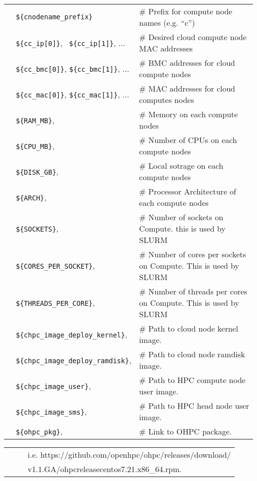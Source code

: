 \begin{tabular}{@{}>{\textbullet}l p{7cm} l}
& \texttt{\$\{cnodename\_prefix\}} & {\small \# Prefix for compute node names (e.g. ``c'')} \\
& \texttt{\$\{cc\_ip[0]\}}, \, \texttt{\$\{cc\_ip[1]\}}, ... & {\small \# Desired cloud compute node MAC addresses} \\
& \texttt{\$\{cc\_bmc[0]\}}, \texttt{\$\{cc\_bmc[1]\}}, ... & {\small \# BMC addresses for cloud compute nodes} \\
& \texttt{\$\{cc\_mac[0]\}}, \texttt{\$\{cc\_mac[1]\}}, ... & {\small \# MAC addresses for cloud computes nodes} \\
& \texttt{\$\{RAM\_MB\}}, & {\small \# Memory on each compute nodes} \\
& \texttt{\$\{CPU\_MB\}}, & {\small \# Number of CPUs on each compute nodes} \\
& \texttt{\$\{DISK\_GB\}}, & {\small \# Local sotrage on each compute nodes} \\
& \texttt{\$\{ARCH\}}, & {\small \# Processor Architecture of each compute nodes} \\
& \texttt{\$\{SOCKETS\}}, & {\small \# Number of sockets  on Compute. this is used by SLURM} \\
& \texttt{\$\{CORES\_PER\_SOCKET\}}, & {\small \# Number of cores per sockets  on Compute. This is used by SLURM} \\
& \texttt{\$\{THREADS\_PER\_CORE\}}, & {\small \# Number of threads per cores on Compute. This is used by SLURM} \\
& \texttt{\$\{chpc\_image\_deploy\_kernel\}}, & {\small \# Path to cloud node kernel image. } \\
& \texttt{\$\{chpc\_image\_deploy\_ramdisk\}}, & {\small \# Path to cloud node ramdisk image. } \\
& \texttt{\$\{chpc\_image\_user\}}, & {\small \# Path to HPC compute node user image. } \\
& \texttt{\$\{chpc\_image\_sms\}}, & {\small \# Path to HPC head node user image. } \\
& \texttt{\$\{ohpc\_pkg\}}, & {\small \# Link to OHPC package.  } \\
\end{tabular}
\begin{tabular}{@{}>{}l p{7cm} l}
& \texttt{} & {\small \ 	i.e. https://github.com/openhpc/ohpc/releases/download/ } \\
& \texttt{} & {\small \ 	v1.1.GA/ohpc\-release\-centos7.2\-1.1\-1.x86\_64.rpm. } \\
\end{tabular}

